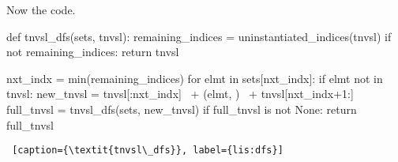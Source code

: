 Now the code.

\begin{minipage}[c]{0.45\textwidth}
\begin{python1}[numbers=left]
def tnvsl_dfs(sets, tnvsl):
  remaining_indices = uninstantiated_indices(tnvsl)
  if not remaining_indices: return tnvsl

  nxt_indx = min(remaining_indices)
  for elmt in sets[nxt_indx]:
    if elmt not in tnvsl:
      new_tnvsl = tnvsl[:nxt_indx] \
                  + (elmt, ) \
                  + tnvsl[nxt_indx+1:]
      full_tnvsl = tnvsl_dfs(sets, new_tnvsl)
      if full_tnvsl is not None: return full_tnvsl
\end{python1}
\begin{lstlisting} [caption={\textit{tnvsl\_dfs}}, label={lis:dfs}]
\end{lstlisting}
\end{minipage}

